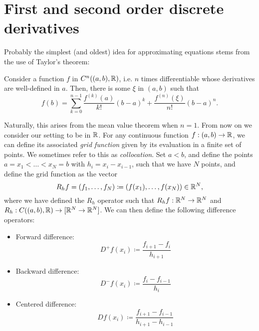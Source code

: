 \section{First and second order discrete derivatives}\label{sec:first-second-fd}
Probably the simplest (and oldest) idea for approximating equations stems from the use of Taylor's theorem:
\begin{theorem}\label{thm:taylor}
    Consider a function $f$ in $C^n((a,b), \mathbb{R})$, i.e. $n$ times differentiable whose derivatives are well-defined in $a$. Then, there is some $\xi$ in $(a,b)$ such that
    \begin{equation}
        f(b) = \sum_{k=0}^{n-1}\frac{f^{(k)}(a)}{k!}(b-a)^k + \frac{f^{(n)}(\xi)}{n!}(b-a)^n.
    \end{equation}
\end{theorem}
Naturally, this arises from the mean value theorem when $n=1$. From now on we consider our setting to be in $\mathbb{R}$. For any continuous function $f:(a,b)\to \mathbb{R}$, we can define its associated \emph{grid function} given by its evaluation in a finite set of points. We sometimes refer to this as \emph{collocation}. Set $a<b$, and define the points $a=x_1<\hdots<x_N=b$ with $h_i=x_{i}-x_{i-1}$, such that we have $N$ points, and define the grid function as the vector
\begin{equation}\label{eq:def-grid-function}
    R_hf = (f_1, \hdots, f_N) \coloneqq (f(x_1), \hdots, f(x_N)) \in \mathbb{R}^N,
\end{equation}
where we have defined the $R_h$ operator such that $R_h f:\mathbb{R}^N \to \mathbb{R}^N$ and $R_h:C((a,b),\mathbb{R})\to [\mathbb{R}^N\to\mathbb{R}^N]$.  We can then define the following difference operators: 
\begin{itemize}
    \item Forward difference: 
        \begin{equation*}
        D^+f(x_i) \coloneqq \frac{f_{i+1} - f_i}{h_{i+1}}
        \end{equation*}
    \item Backward difference: 
        \begin{equation*}
        D^-f(x_i) \coloneqq \frac{f_{i} - f_{i-1}}{h_{i}}
        \end{equation*}
    \item Centered difference:
        \begin{equation*}
        Df(x_i) \coloneqq \frac{f_{i+1} - f_{i-1}}{h_{i+1} - h_{i-1}}
        \end{equation*}
\end{itemize}
